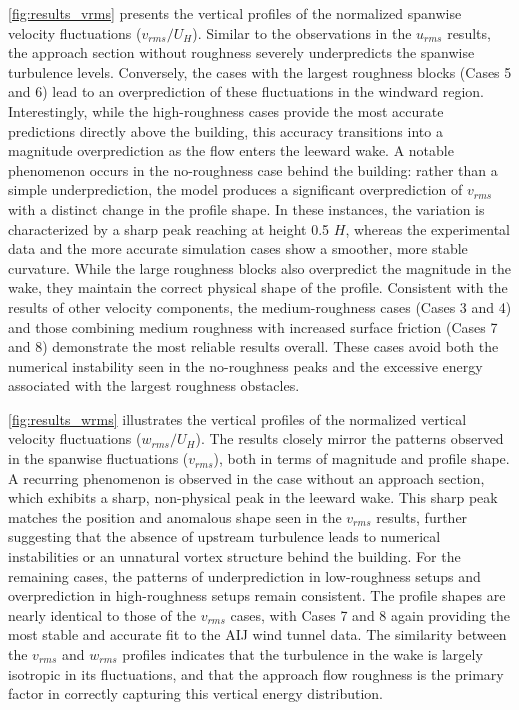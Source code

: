 \newpage

\autoref{fig:results_vrms} presents the vertical profiles of the normalized spanwise velocity fluctuations ($v_{rms}/U_H$). Similar to the observations in the $u_{rms}$ results, the approach section without roughness severely underpredicts the spanwise turbulence levels. Conversely, the cases with the largest roughness blocks (Cases 5 and 6) lead to an overprediction of these fluctuations in the windward region. Interestingly, while the high-roughness cases provide the most accurate predictions directly above the building, this accuracy transitions into a magnitude overprediction as the flow enters the leeward wake. A notable phenomenon occurs in the no-roughness case behind the building: rather than a simple underprediction, the model produces a significant overprediction of $v_{rms}$ with a distinct change in the profile shape. In these instances, the variation is characterized by a sharp peak reaching at height 0.5 $H$, whereas the experimental data and the more accurate simulation cases show a smoother, more stable curvature. While the large roughness blocks also overpredict the magnitude in the wake, they maintain the correct physical shape of the profile. Consistent with the results of other velocity components, the medium-roughness cases (Cases 3 and 4) and those combining medium roughness with increased surface friction (Cases 7 and 8) demonstrate the most reliable results overall. These cases avoid both the numerical instability seen in the no-roughness peaks and the excessive energy associated with the largest roughness obstacles.

\autoref{fig:results_wrms} illustrates the vertical profiles of the normalized vertical velocity fluctuations ($w_{rms}/U_H$). The results closely mirror the patterns observed in the spanwise fluctuations ($v_{rms}$), both in terms of magnitude and profile shape. A recurring phenomenon is observed in the case without an approach section, which exhibits a sharp, non-physical peak in the leeward wake. This sharp peak matches the position and anomalous shape seen in the $v_{rms}$ results, further suggesting that the absence of upstream turbulence leads to numerical instabilities or an unnatural vortex structure behind the building. For the remaining cases, the patterns of underprediction in low-roughness setups and overprediction in high-roughness setups remain consistent. The profile shapes are nearly identical to those of the $v_{rms}$ cases, with Cases 7 and 8 again providing the most stable and accurate fit to the AIJ wind tunnel data. The similarity between the $v_{rms}$ and $w_{rms}$ profiles indicates that the turbulence in the wake is largely isotropic in its fluctuations, and that the approach flow roughness is the primary factor in correctly capturing this vertical energy distribution.

